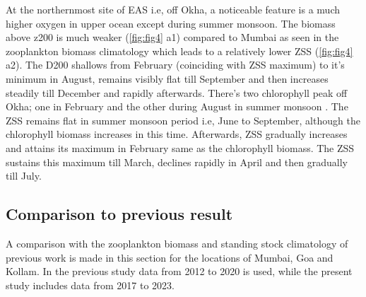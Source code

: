 \documentclass{article}
\begin{document}
	 At the northernmost site of EAS i.e, off Okha, a noticeable feature is a much higher oxygen in upper ocean except during summer monsoon. The biomass above z200 is much weaker (\cref{fig:fig4} a1) compared to Mumbai as seen in the zooplankton biomass climatology which leads to a relatively lower ZSS (\cref{fig:fig4} a2). The D200 shallows from February (coinciding with ZSS maximum) to it's minimum in August,  remains visibly flat till September and then increases steadily till December and rapidly afterwards. There's two chlorophyll peak off Okha; one in February \citep{keerthi2017physical} and the other during August in summer monsoon \citep{levy2007basin}. The ZSS remains flat in summer monsoon period i.e, June to September, although the chlorophyll biomass increases in this time. Afterwards, ZSS gradually increases and attains its maximum in February same as the chlorophyll biomass. The ZSS sustains this maximum till March, declines rapidly in April and then gradually till July.
	 
	\subsection{Comparison to previous result}	 
	A comparison with the zooplankton biomass and standing stock climatology of previous work \citep{aparna2022seasonal} is made in this section for the locations of Mumbai, Goa and Kollam. In the previous study data from 2012 to 2020 is used, while the present study includes data from 2017 to 2023.
	 
\end{document}
